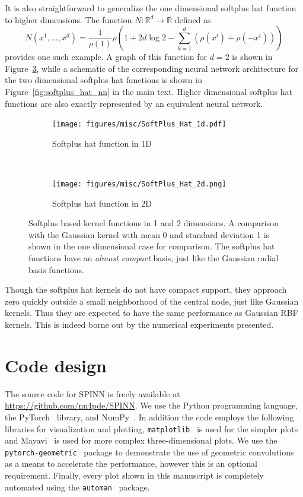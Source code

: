 \documentclass[12pt]{article}
\newcommand{\code}[1]{\lstinline{#1}}
\begin{document}
It is also straightforward to generalize the one dimensional softplus hat function to higher dimensions. The function $N:\mathbb{R}^d \to \mathbb{R}$ defined as
\begin{equation} \label{eq:hat_softplus_nd1}
N(x^1, \ldots, x^d) = \frac{1}{\rho(1)}\rho\left(1 + 2d\log 2 - \sum_{k=1}^d (\rho(x^i) + \rho(-x^i))\right)
\end{equation}
provides one such example. A graph of this function for $d = 2$ is shown in Figure~\ref{fig:softplus_hat_2d}, while a schematic of the corresponding neural network architecture for the two dimensional softplus hat functions is shown in Figure~\ref{fig:softplus_hat_nn} in the main text. Higher dimensional softplus hat functions are also exactly represented by an equivalent neural network.

\begin{figure}[htpb]
\begin{subfigure}{0.4\textwidth}
\centering
\texttt{[image: figures/misc/SoftPlus\_Hat\_1d.pdf]}
\caption{Softplus hat function in 1D}
\label{fig:softplus_hat_1d}
\end{subfigure}
~
\begin{subfigure}{0.6\textwidth}
\centering
\texttt{[image: figures/misc/SoftPlus\_Hat\_2d.png]}
\caption{Softplus hat function in 2D}
\label{fig:softplus_hat_2d}
\end{subfigure}
\caption{Softplus based kernel functions in 1 and 2 dimensions. A comparison with the Gaussian kernel with mean 0 and standard deviation 1 is shown in the one dimensional case for comparison. The softplus hat functions have an \emph{almost compact} basis, just like the Gaussian radial basis functions.}
\end{figure}

Though the softplus hat kernels do not have compact support, they approach zero quickly outside a small neighborhood of the central node, just like Gaussian kernels. Thus they are expected to have the same performance as Gaussian RBF kernels. This is indeed borne out by the numerical experiments presented.

\section{Code design}

\begin{sloppypar}
The source code for SPINN is freely available at \url{https://github.com/nn4pde/SPINN}.  We use the Python programming language, the PyTorch~\cite{pytorch} library, and NumPy~\cite{numpy}.  In addition the code employs the following libraries for visualization and plotting, \code{matplotlib}~\cite{mpl} is used for the simpler plots and Mayavi~\cite{mayavi} is used for more complex three-dimensional plots.  We use the \code{pytorch-geometric}~\cite{pytorch_geometric} package to demonstrate the use of geometric convolutions as a means to accelerate the performance, however this is an optional requirement.  Finally, every plot shown in this manuscript is completely automated using the \code{automan}~\cite{automan:2018} package.
\end{sloppypar}
\end{document}
